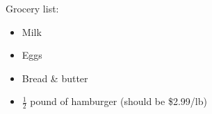 \documentclass{article}
\begin{document}
\begin{center}      %
    Grocery list:
\end{center}

\begin{itemize}      %
    \item Milk       %
    \item Eggs
    \item Bread \& butter      %
    \item $\frac{1}{2}$ pound of hamburger (should be \$2.99/lb)      %
\end{itemize}
\end{document}
